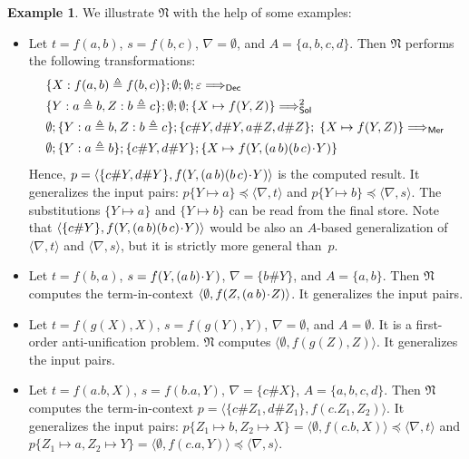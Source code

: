 \documentclass[11pt,a4paper]{amsart}
\theoremstyle{definition}
\newtheorem{example}{Example}
\newcommand{\Lra}{\Longrightarrow}
\newcommand{\frN}{\mathfrak N}
\newcommand{\swap}[2]{\ensuremath{(#1\, #2)}}
\newcommand{\permap}{{\mkern 1mu\cdot \mkern 1mu}}
\newcommand{\ids}{\varepsilon}
\newcommand{\np}[2]{\langle #1, \allowbreak #2\rangle}
\newcommand{\Atoms}{A}
\newcommand{\nablai}{{\nabla}}
\begin{document}
\begin{example}\label{exmp:nau}
We illustrate $\frN$ with the help of some examples:
\begin{itemize}
\item Let $ t=f(a,b)$, $ s=f(b,c)$, $ \nablai =\emptyset$, and
$\Atoms=\{a,b,c,d\}$. Then $\frN$ performs the following
transformations:
  \begin{alignat*}{3}
  &\{ X: f(a,b) \triangleq f(b,c) \};  \emptyset;\emptyset; \ids \Lra_{\mathsf{Dec}}{} \\
  & \{ { Y: a \triangleq b, Z: b \triangleq  c }\};   \emptyset;\emptyset;\{ { X \mapsto f(Y,Z )}\} \Lra^2_{\mathsf{Sol}}{} \\
  & \emptyset;  \{ { Y: a \triangleq  b, Z: b \triangleq  c }\}; \{{ c\# Y, d\#Y, a\# Z, d\# Z}\};\; \{ X \mapsto f(Y,Z)\} \Lra_{\mathsf{Mer}}{} \\
  & \emptyset; \{ { Y: a \triangleq b}\};  \{{ c\# Y, d\# Y}\};\{ { X \mapsto f(Y,\swap{a}{b}\swap{b}{c}\permap Y)}\}
\end{alignat*}
%
Hence, $p=\np{\{c\# Y, d\#Y \}}{f(Y,\swap{a}{b}\swap{b}{c}\permap Y)}$ is the
computed result. It generalizes the input pairs: $p\{ Y \mapsto a\} \preceq
\np{\nablai}{t} $ and $p\{Y \mapsto
  b\} \preceq \np{\nablai}{s}$. The substitutions $\{ Y \mapsto a\}$ and $\{Y \mapsto
  b\}$ can be read from
the final store. Note that $\np{\{c\# Y\}}{f(Y,\swap{a}{b}\swap{b}{c}\permap
  Y)}$ would be also an $\Atoms$-based generalization of
$\np{\nablai}{t}$ and $\np{\nablai}{s}$, but it is strictly more
general than~$p$.

\item
Let $ t=f(b,a)$, $ s=f(Y,\swap{a}{b}\permap Y)$, $ \nablai =\{b\# Y\}$, and
$\Atoms=\{a,b\}$. Then $\frN$ computes the term-in-context
$\np{\emptyset}{f(Z,\swap{a}{b}\permap Z)}$. It generalizes the input
pairs.


\item
Let $ t=f(g(X),X)$, $ s=f(g(Y),Y)$, $ \nablai =\emptyset$, and
$\Atoms=\emptyset$. It is a first-order anti-unification problem. $\frN$ computes
$\np{\emptyset}{f(g(Z),Z)}$. It generalizes the input pairs.





\item
Let $ t = f(a.b,X)$, $ s= f(b.a,Y)$, $ \nablai =\{c\# X\}$,
$\Atoms=\{a,b,c,d\}$. Then $\frN$ computes the term-in-context
$p=\np{\{c\# Z_1,d\#Z_1\}}{f(c.Z_1,Z_2)}$. It generalizes the input
pairs: $p\{Z_1\mapsto b,Z_2\mapsto X\}=\np{\emptyset}{f(c.b,X)}\preceq \np{\nablai}{t}$ and
  $p\{Z_1\mapsto a,Z_2\mapsto Y\} =\np{\emptyset}{f(c.a,Y)}\preceq \np{\nablai}{s}$.  

\end{itemize}
\end{example}
\end{document}
